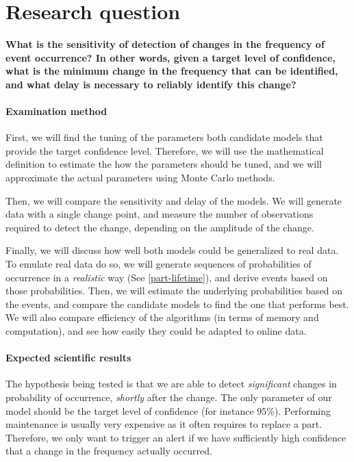 \documentclass{kththesis}
\begin{document}
\section{Research question}

\textbf{What is the sensitivity of detection of changes in the frequency of event occurrence? In other words, given a target level of confidence, what is the minimum change in the frequency that can be identified, and what delay is necessary to reliably identify this change?}

\medskip

\paragraph*{Examination method}

First, we will find the tuning of the parameters both candidate models that provide the target confidence level. 
Therefore, we will use the mathematical definition to estimate the how the parameters should be tuned, and we will approximate the actual parameters using Monte Carlo methods. 

Then, we will compare the sensitivity and delay of the models. We will generate data with a single change point, and measure the number of observations required to detect the change, depending on the amplitude of the change.

Finally, we will discuss how well both models could be generalized to real data. 
To emulate real data do so, we will generate sequences of probabilities of occurrence in a \emph{realistic} way (See \ref{part-lifetime}), and derive events based on those probabilities. Then, we will estimate the underlying probabilities based on the events, and compare the candidate models to find the one that performs best. We will also compare efficiency of the algorithms (in terms of memory and computation), and see how easily they could be adapted to online data.

\paragraph*{Expected scientific results}

The hypothesis being tested is that we are able to detect \emph{significant} changes in probability of occurrence, \emph{shortly} after the change. 
The only parameter of our model should be the target level of confidence (for instance $95\%$).
Performing maintenance is usually very expensive as it often requires to replace a part. Therefore, we only want to trigger an alert if we have sufficiently high  confidence that a change in the frequency actually occurred.
\end{document}
